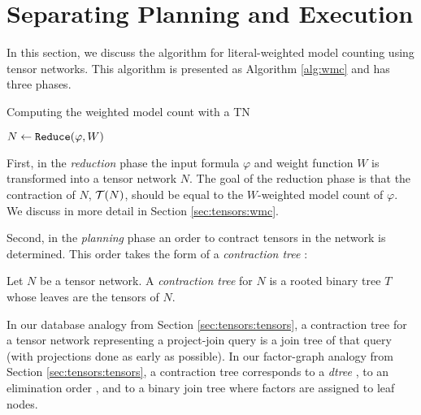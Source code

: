 \section{Separating Planning and Execution}
\label{sec:tensors:algorithm}
In this section, we discuss the algorithm for literal-weighted model counting using tensor networks. This algorithm is presented as Algorithm \ref{alg:wmc} and has three phases.

\begin{algorithm*}[t]
    \caption{Computing the weighted model count with a TN}
    \label{alg:wmc}
    \DontPrintSemicolon
    $N \gets \texttt{\upshape Reduce}(\varphi, W)$\;
\end{algorithm*}

First, in the \emph{reduction} phase the input formula $\varphi$ and weight function $W$ is transformed into a tensor network $N$. The goal of the reduction phase is that the contraction of $N$, $\mathcal{T}(N)$, should be equal to the $W$-weighted model count of $\varphi$. We discuss in more detail in Section \ref{sec:tensors:wmc}.

Second, in the \emph{planning} phase an order to contract tensors in the network is determined.
This order takes the form of a \emph{contraction tree} \cite{EP14}:
\begin{definition} \label{def:contraction-tree}
	Let $N$ be a tensor network. A \emph{contraction tree} for $N$ is a rooted binary tree $T$ whose leaves are the tensors of $N$. %
\end{definition}

In our database analogy from Section \ref{sec:tensors:tensors}, a contraction tree for a tensor network representing a project-join query is a join tree of that query (with projections done as early as possible). 
In our factor-graph analogy from Section \ref{sec:tensors:tensors}, a contraction tree corresponds to a \emph{dtree} \cite{darwiche01}, to an elimination order \cite{darwiche01b}, and to a binary join tree \cite{shenoy97} where factors are assigned to leaf nodes.

